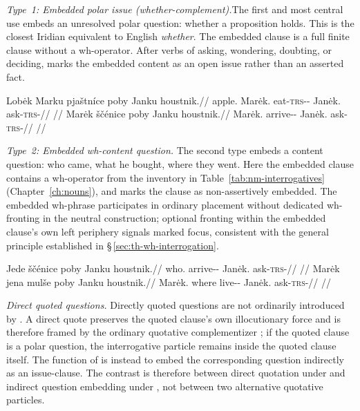 \noindent\textit{Type~1: Embedded polar issue (\textit{whether}-complement).}\quad  The
first and most central use embeds an unresolved polar question: whether a
proposition holds. This is the closest Iridian equivalent to English
\textit{whether}. The embedded clause is a full finite clause without a
wh-operator. After verbs of asking, wondering, doubting, or deciding, 
marks the embedded content as an open issue rather than an asserted fact.

\pex
\a
\begingl
\gla Lobėk Marku pjaštníce poby Janku houstnik.//
\glb apple.\Dir{} Marėk.\Trs{} eat-\textsc{trs}-\Pf{}-\Lnk{} \Compl{} Janėk.\Trs{} ask-\textsc{trs}-\Pf{}//
\glft {}//
\endgl
\a
\begingl
\gla Marėk ščénice poby Janku houstnik.//
\glb Marėk.\Dir{} arrive-\Pf{}-\Lnk{} \Compl{} Janėk.\Trs{} ask-\textsc{trs}-\Pf{}//
\glft {}//
\endgl
\xe

\noindent\textit{Type~2: Embedded wh-content question.}\quad
The second type embeds a content question: who came, what he bought, where they
went. Here the embedded clause contains a wh-operator from the inventory in
Table~\ref{tab:nm-interrogatives} (Chapter~\ref{ch:nouns}), and  marks
the clause as non-assertively embedded. The embedded wh-phrase participates in ordinary placement without dedicated
wh-fronting in the neutral construction; optional fronting within the embedded
clause's own left periphery signals marked focus, consistent with the general
principle established in §\,\ref{sec:th-wh-interrogation}.

\pex
\a
\begingl
\gla Jede ščénice poby Janku houstnik.//
\glb who.\Dir{} arrive-\Pf{}-\Lnk{} \Compl{} Janėk.\Trs{} ask-\textsc{trs}-\Pf{}//
\glft {} //
\endgl
\a
\begingl
\gla Marėk jena mulše poby Janku houstnik.//
\glb Marėk.\Dir{} where live-\Cont{}-\Lnk{} \Compl{} Janėk.\Trs{} ask-\textsc{trs}-\Pf{}//
\glft {} //
\endgl
\xe

\noindent\textit{Direct quoted questions.}\quad
Directly quoted questions are not ordinarily introduced by . A direct
quote preserves the quoted clause's own illocutionary force and is therefore
framed by the ordinary quotative complementizer ; if the quoted clause
is a polar question, the interrogative particle  remains inside the
quoted clause itself. The function of  is instead to embed the
corresponding question indirectly as an issue-clause. The contrast is therefore
between direct quotation under  and indirect question embedding under
, not between two alternative quotative particles.

